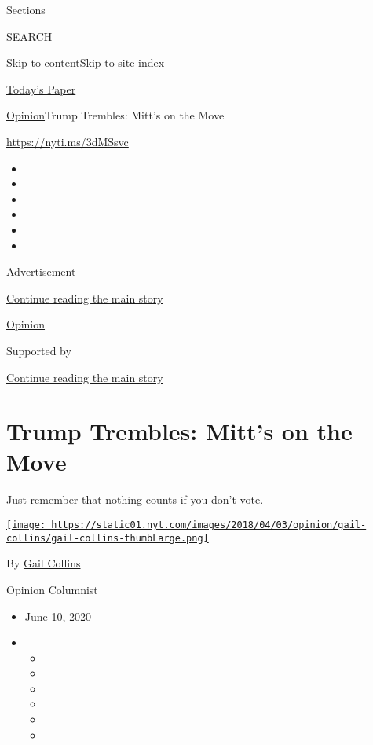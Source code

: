 Sections

SEARCH

\protect\hyperlink{site-content}{Skip to
content}\protect\hyperlink{site-index}{Skip to site index}

\href{https://myaccount.nytimes.com/auth/login?response_type=cookie\&client_id=vi}{}

\href{https://www.nytimes.com/section/todayspaper}{Today's Paper}

\href{/section/opinion}{Opinion}\textbar{}Trump Trembles: Mitt's on the
Move

\href{https://nyti.ms/3dMSsvc}{https://nyti.ms/3dMSsvc}

\begin{itemize}
\item
\item
\item
\item
\item
\item
\end{itemize}

Advertisement

\protect\hyperlink{after-top}{Continue reading the main story}

\href{/section/opinion}{Opinion}

Supported by

\protect\hyperlink{after-sponsor}{Continue reading the main story}

\hypertarget{trump-trembles-mitts-on-the-move}{%
\section{Trump Trembles: Mitt's on the
Move}\label{trump-trembles-mitts-on-the-move}}

Just remember that nothing counts if you don't vote.

\href{https://www.nytimes.com/by/gail-collins}{\texttt{[image: https://static01.nyt.com/images/2018/04/03/opinion/gail-collins/gail-collins-thumbLarge.png]}}

By \href{https://www.nytimes.com/by/gail-collins}{Gail Collins}

Opinion Columnist

\begin{itemize}
\item
  June 10, 2020
\item
  \begin{itemize}
  \item
  \item
  \item
  \item
  \item
  \item
  \end{itemize}
\end{itemize}

